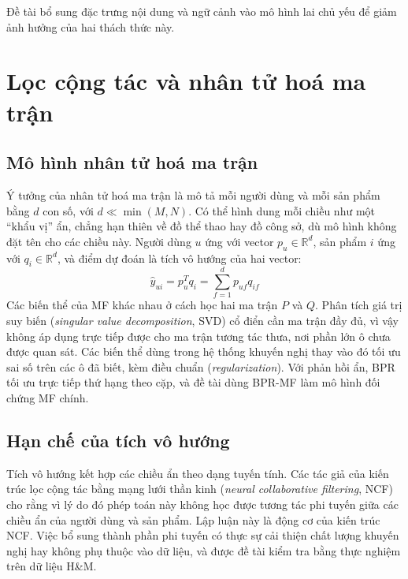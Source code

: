 Đề tài bổ sung đặc trưng nội dung và ngữ cảnh vào mô hình lai chủ yếu để giảm ảnh hưởng của hai thách thức này.

\section{Lọc cộng tác và nhân tử hoá ma trận}
\label{sec:cf_mf}

\subsection{Mô hình nhân tử hoá ma trận}
\label{subsec:mf_model}

Ý tưởng của nhân tử hoá ma trận \parencite{koren2009matrix} là mô tả mỗi người dùng và mỗi sản phẩm bằng $d$ con số, với $d \ll \min(M, N)$. Có thể hình dung mỗi chiều như một ``khẩu vị'' ẩn, chẳng hạn thiên về đồ thể thao hay đồ công sở, dù mô hình không đặt tên cho các chiều này. Người dùng $u$ ứng với vector $p_u \in \mathbb{R}^d$, sản phẩm $i$ ứng với $q_i \in \mathbb{R}^d$, và điểm dự đoán là tích vô hướng của hai vector:
\begin{equation}
    \hat{y}_{ui} = p_u^T q_i = \sum_{f=1}^{d} p_{uf} q_{if}
    \label{eq:mf_dot}
\end{equation}
Các biến thể của MF khác nhau ở cách học hai ma trận $P$ và $Q$. Phân tích giá trị suy biến (\textit{singular value decomposition}, SVD) cổ điển cần ma trận đầy đủ, vì vậy không áp dụng trực tiếp được cho ma trận tương tác thưa, nơi phần lớn ô chưa được quan sát. Các biến thể dùng trong hệ thống khuyến nghị thay vào đó tối ưu sai số trên các ô đã biết, kèm điều chuẩn (\textit{regularization}). Với phản hồi ẩn, BPR tối ưu trực tiếp thứ hạng theo cặp, và đề tài dùng BPR-MF làm mô hình đối chứng MF chính.

\subsection{Hạn chế của tích vô hướng}
\label{subsec:mf_limitations}

Tích vô hướng kết hợp các chiều ẩn theo dạng tuyến tính. Các tác giả của kiến trúc lọc cộng tác bằng mạng lưới thần kinh (\textit{neural collaborative filtering}, NCF) cho rằng vì lý do đó phép toán này không học được tương tác phi tuyến giữa các chiều ẩn của người dùng và sản phẩm. Lập luận này là động cơ của kiến trúc NCF. Việc bổ sung thành phần phi tuyến có thực sự cải thiện chất lượng khuyến nghị hay không phụ thuộc vào dữ liệu, và được đề tài kiểm tra bằng thực nghiệm trên dữ liệu H\&M.

